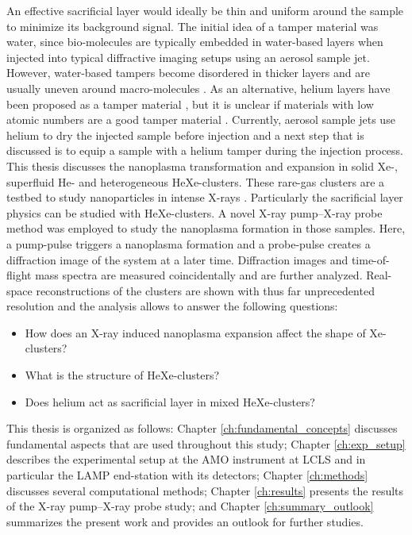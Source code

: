 %
An effective sacrificial layer would ideally be thin and uniform around the sample to minimize its background signal. The initial idea of a tamper material was water, since bio-molecules are typically embedded in water-based layers when injected into typical diffractive imaging setups using an aerosol sample jet. However, water-based tampers become disordered in thicker layers and are usually uneven around macro-molecules \cite{Aquila-2015-StrucDyn}. As an alternative, helium layers have been proposed as a tamper material \cite{Mikaberidze-2008-PRA}, but it is unclear if materials with low atomic numbers are a good tamper material \cite{Hau-Riege-2007-PRL}. Currently, aerosol sample jets use helium to dry the injected sample before injection and a next step that is discussed \cite{Bielecki-2016-PC} is to equip a sample with a helium tamper during the injection process.\\[1\baselineskip]
%
This thesis discusses the nanoplasma transformation and expansion in solid Xe-, superfluid He- and heterogeneous HeXe-clusters. These rare-gas clusters are a testbed to study nanoparticles in intense X-rays \cite{Fennel-2010-RMP}. Particularly the sacrificial layer physics can be studied with HeXe-clusters. A novel X-ray pump--X-ray probe method \cite{Lutman-2013-PRL} was employed to study the nanoplasma formation in those samples. Here, a pump-pulse triggers a nanoplasma formation and a probe-pulse creates a diffraction image of the system at a later time. Diffraction images and time-of-flight mass spectra are measured coincidentally and are further analyzed. Real-space reconstructions of the clusters are shown with thus far unprecedented resolution and the analysis allows to answer the following questions:
\begin{itemize}
	\item How does an X-ray induced nanoplasma expansion affect the shape of Xe-clusters?
	\item What is the structure of HeXe-clusters?
	\item Does helium act as sacrificial layer in mixed HeXe-clusters?
\end{itemize}
%
This thesis is organized as follows: Chapter \ref{ch:fundamental_concepts} discusses fundamental aspects that are used throughout this study; Chapter \ref{ch:exp_setup} describes the experimental setup at the AMO instrument at LCLS and in particular the LAMP end-station with its detectors; Chapter \ref{ch:methods} discusses several computational methods; Chapter \ref{ch:results} presents the results of the X-ray pump--X-ray probe study; and Chapter \ref{ch:summary_outlook} summarizes the present work and provides an outlook for further studies.
%
%
%
